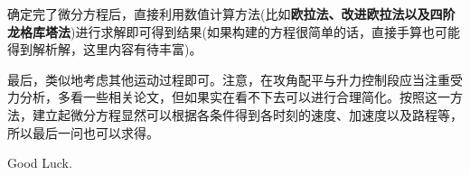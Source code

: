 \documentclass[]{article}
\begin{document}
	确定完了微分方程后，直接利用数值计算方法(比如\textbf{欧拉法、改进欧拉法以及四阶龙格库塔法})进行求解即可得到结果(如果构建的方程很简单的话，直接手算也可能得到解析解，这里内容有待丰富)。

	最后，类似地考虑其他运动过程即可。注意，在攻角配平与升力控制段应当注重受力分析，多看一些相关论文，但如果实在看不下去可以进行合理简化。按照这一方法，建立起微分方程显然可以根据各条件得到各时刻的速度、加速度以及路程等，所以最后一问也可以求得。

Good Luck.
\end{document}
